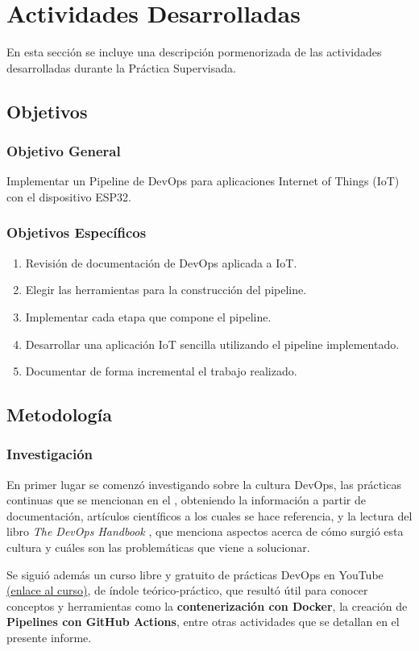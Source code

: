 \chapter{Actividades Desarrolladas}\label{cap:actividades}
En esta sección se incluye una descripción pormenorizada de las actividades desarrolladas durante la Práctica Supervisada.

\section{Objetivos}
\subsection{Objetivo General}
Implementar un Pipeline de DevOps para aplicaciones Internet of Things (IoT) con el dispositivo ESP32.
\subsection{Objetivos Específicos}
\begin{enumerate}
\item Revisión de documentación de DevOps aplicada a IoT.
\item Elegir las herramientas para la construcción del pipeline.
\item Implementar cada etapa que compone el pipeline.
\item Desarrollar una aplicación IoT sencilla utilizando el pipeline implementado.
\item Documentar de forma incremental el trabajo realizado.
\end{enumerate}

\newpage
\section{Metodología}
\subsection{Investigación}
En primer lugar se comenzó investigando sobre la cultura DevOps, las prácticas continuas que se mencionan en el , obteniendo la información a partir de documentación, artículos científicos a los cuales se hace referencia, y la lectura del libro \textit{The DevOps Handbook} \cite{DevOpsHandbook}, que menciona aspectos acerca de cómo surgió esta cultura y cuáles son las problemáticas que viene a solucionar. 

Se siguió además un curso libre y gratuito de prácticas DevOps en YouTube \href{https://www.youtube.com/watch?v=wdFwjWyF47g&list=PLnf4-vBnJ1n1Es3RyaqeIzprp4xUivflP}{(enlace al curso)}, de índole teórico-práctico, que resultó útil para conocer conceptos y herramientas como la \textbf{contenerización con Docker}, la creación de \textbf{Pipelines con GitHub Actions}, entre otras actividades que se detallan en el presente informe. 

